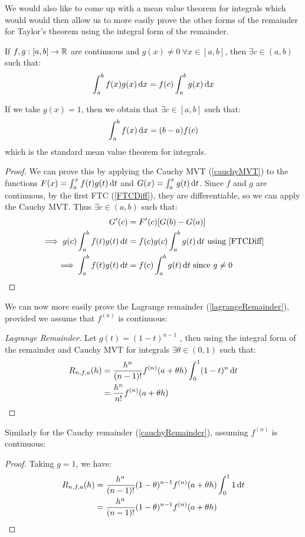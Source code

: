 \documentclass[../main.tex]{subfiles}
\begin{document}
We would also like to come up with a mean value theorem for integrals which would would then allow us to more easily prove the other forms of the remainder for Taylor's theorem using the integral form of the remainder.
\begin{proposition}
  If $f, g: [a, b] \to \mathbb{R}$ are continuous and $g(x) \neq 0\ \forall x \in [a, b]$, then $\exists c\in (a, b)$ such that:
  \[
    \int_{a}^{b} f(x)g(x) \d{x} = f(c) \int_{a}^{b} g(x) \d{x}
  \]
\end{proposition}
\begin{remark}
  If we take $g(x) = 1$, then we obtain that $\exists c \in [a, b]$ such that:
  \[
    \int_{a}^{b} f(x) \d{x} = (b - a)f(c)
  \]
  which is the standard mean value theorem for integrals.
\end{remark}
\begin{proof}
  We can prove this by applying the Cauchy MVT (\cref{cauchyMVT}) to the functions $F(x) = \int_{a}^{x} f(t)g(t) \d{t}$ and $G(x) = \int_{a}^{x} g(t) \d{t}$.
  Since $f$ and $g$ are continuous, by the first FTC (\cref{FTCDiff}), they are differentiable, so we can apply the Cauchy MVT.
  Thus $\exists c \in (a, b)$ such that:
  \begin{align*}
    [F(b) - F(a)]G'(c) &= F'(c)[G(b) - G(a)] \\
    \implies g(c)\int_{a}^{b} f(t)g(t) \d{t} &= f(c)g(c) \int_{a}^{b} g(t) \d{t} \text{ using \cref{FTCDiff}} \\
    \implies \int_{a}^{b} f(t)g(t) \d{t} &= f(c)\int_{a}^{b} g(t) \d{t} \text{ since $g \neq 0$}
  \end{align*}
\end{proof}
We can now more easily prove the Lagrange remainder (\cref{lagrangeRemainder}), provided we assume that $f^{(n)}$ is continuous:
\begin{proof}[Lagrange Remainder]
  Let $g(t) = (1 - t)^{n - 1}$ , then using the integral form of the remainder and Cauchy MVT for integrals $\exists \theta \in (0, 1)$ such that:
  \begin{align*}
    R_{n, f, a}(h) &= \frac{h^{n}}{(n - 1)!}f^{(n)}(a + \theta h) \int_{0}^{1} (1 - t)^{n} \d{t} \\
                   &= \frac{h^{n}}{n!}f^{(n)}(a + \theta h)
  \end{align*}
\end{proof}
Similarly for the Cauchy remainder (\cref{cauchyRemainder}), assuming $f^{(n)}$ is continuous:
\begin{proof}
  Taking $g = 1$, we have:
  \begin{align*}
    R_{n, f, a}(h) &= \frac{h^{n}}{(n - 1)!} (1 - \theta)^{n - 1} f^{(n)}(a + \theta h) \int_{0}^{1} 1 \d{t} \\
                   &= \frac{h^{n}}{(n - 1)!} (1 - \theta)^{n - 1} f^{(n)}(a + \theta h)
  \end{align*}
\end{proof}
\end{document}
